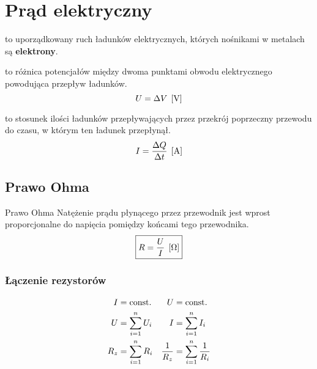 \chapter{Prąd elektryczny}
  \begin{definition}
     to uporządkowany ruch ładunków elektrycznych, których nośnikami w metalach są \textbf{elektrony}.
  \end{definition}

  \begin{definition}
     to różnica potencjałów między dwoma pun\-ktami obwodu elektrycznego powodująca przepływ ładunków.
    \begin{equation}
      U = \Delta V \;\left[\mathrm{V}\right]
    \end{equation}
  \end{definition}

  \begin{definition}
     to stosunek ilości ładunków przepływających przez przekrój poprzeczny przewodu do czasu, w którym ten ładunek przepłynął.
    \begin{equation}
      I = \frac{\Delta Q}{\Delta t} \;\left[\mathrm{A}\right]
    \end{equation}
  \end{definition}

  \section{Prawo Ohma}
    \begin{law}{Prawo Ohma}
      Natężenie prądu płynącego przez przewodnik jest wprost proporcjonalne do napięcia pomiędzy końcami tego przewodnika.
      \begin{equation}
        \boxed{R = \frac{U}{I} \;\left[\mathrm{\Omega}\right]}
      \end{equation}
    \end{law}

    \subsection{Łączenie rezystorów}
      \begin{align*}
        I &= \operatorname{const.} & U &= \operatorname{const.}\\
        U &= \sum_{i=1}^n U_i & I &= \sum_{i=1}^n I_i\\
        R_z &= \sum_{i=1}^n R_i & \frac{1}{R_z} &= \sum_{i=1}^n \frac{1}{R_i}
      \end{align*}

